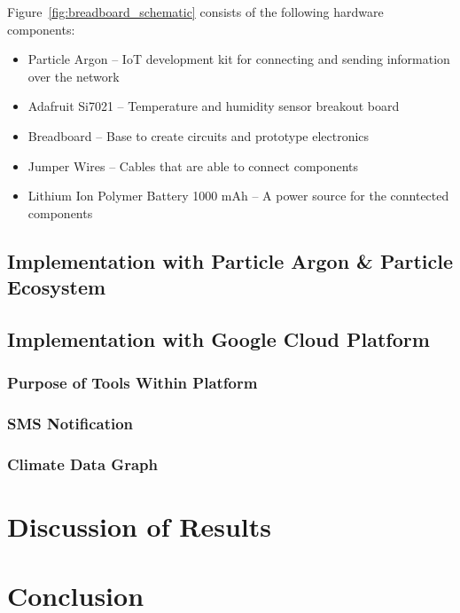 \documentclass{article}
\begin{document}
Figure~\ref{fig:breadboard_schematic} consists of the following hardware components:

\begin{itemize}
	\item Particle Argon -- IoT development kit for connecting and sending information over the network
	\item Adafruit Si7021 -- Temperature and humidity sensor breakout board
	\item Breadboard -- Base to create circuits and prototype electronics
	\item Jumper Wires -- Cables that are able to connect components
	\item Lithium Ion Polymer Battery 1000 mAh -- A power source for the conntected components
\end{itemize}

\subsection{Implementation with Particle Argon \& Particle Ecosystem}
\subsection{Implementation with Google Cloud Platform }
\subsubsection{Purpose of Tools Within Platform}
\subsubsection{SMS Notification}
\subsubsection{Climate Data Graph}




\section{Discussion of Results}

\section{Conclusion}
\end{document}
